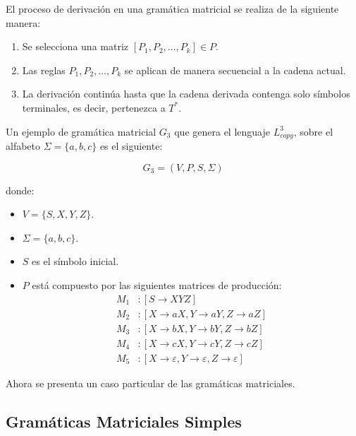 \documentclass[12pt]{article}
\begin{document}
El proceso de derivación en una gramática matricial se realiza de la siguiente manera:
\begin{enumerate}
    \item Se selecciona una matriz \( [P_1, P_2, \dots, P_k] \in P \).
    \item Las reglas \( P_1, P_2, \dots, P_k \) se aplican de manera secuencial a la cadena actual.
    \item La derivación continúa hasta que la cadena derivada contenga solo símbolos terminales, es decir, pertenezca a \( T^* \).
\end{enumerate}

Un ejemplo de gramática matricial \( G_3 \) que genera el lenguaje \( L_{copy}^3\), sobre el alfabeto $\Sigma=\{a,b,c\}$ es el siguiente:

\[
    G_3 = (V, P, S, \Sigma)
\]

donde:
\begin{itemize}
    \item \( V = \{ S, X, Y, Z \} \).
    \item \( \Sigma = \{ a, b, c \} \).
    \item \( S \) es el símbolo inicial.
    \item \( P \) está compuesto por las siguientes matrices de producción:
          \[
              \begin{aligned}
                  M_1 & : [S \to XYZ]                                               \\
                  M_2 & : [X \to aX, Y \to aY, Z \to aZ]                            \\
                  M_3 & : [X \to bX, Y \to bY, Z \to bZ]                            \\
                  M_4 & : [X \to cX, Y \to cY, Z \to cZ]                            \\
                  M_5 & : [X \to \varepsilon, Y \to \varepsilon, Z \to \varepsilon]
              \end{aligned}
          \]
\end{itemize}

Ahora se presenta un caso particular de las gramáticas matriciales.

\subsection{Gramáticas Matriciales Simples}
\end{document}
